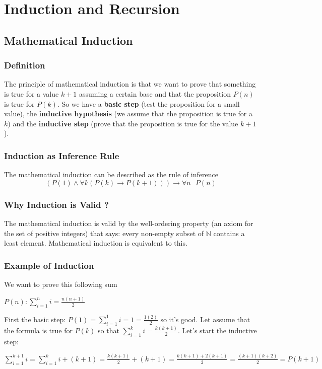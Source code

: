 \documentclass{article}
\begin{document}
\newpage
\section{Induction and Recursion}
\subsection{Mathematical Induction}
\subsubsection{Definition} The principle of mathematical induction is that we want to prove that something is true for a value $ k + 1 $ assuming a certain base and that the proposition $ P(n) $ is true for $ P(k) $. So we have a \textbf{basic step} (test the proposition for a small value), the \textbf{inductive hypothesis} (we assume that the proposition is true for a $ k $) and the \textbf{inductive step} (prove that the proposition is true for the value $ k + 1 $).

\subsubsection{Induction as Inference Rule} The mathematical induction can be described as the rule of inference
\begin{equation}
(P(1) \wedge \forall k(P(k) \rightarrow P(k + 1))) \rightarrow \forall n \textit{ } P(n)
\end{equation}

\subsubsection{Why Induction is Valid ?} The mathematical induction is valid by the well-ordering property (an axiom for the set of positive integers) that says: every non-empty subset of $ \mathbb{N} $ contains a least element. Mathematical induction is equivalent to this.

\subsubsection{Example of Induction} We want to prove this following sum
\begin{center}
$ P(n): \sum_{i=1}^n i = \frac{n(n + 1)}{2} $
\end{center}
First the basic step: $ P(1) = \sum_{i=1}^{1} i = 1 = \frac{1(2)}{2} $ so it's good. Let assume that the formula is true for $ P(k) $ so that $ \sum_{i=1}^k i = \frac{k(k+1)}{2} $. Let's start the inductive step: 
\begin{center}
$ \sum_{i=1}^{k+1} i = \sum_{i=1}^{k}i + (k + 1) = \frac{k(k + 1)}{2} + (k + 1) = \frac{k(k + 1) + 2(k + 1)}{2} = \frac{(k + 1)(k + 2)}{2} = P(k + 1) $
\end{center}
\end{document}
